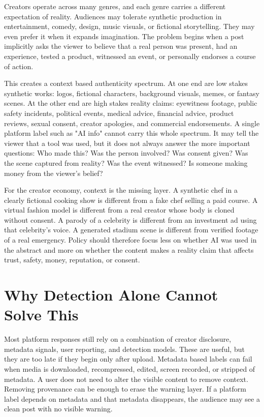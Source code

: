\documentclass[11pt]{article}
\begin{document}
Creators operate across many genres, and each genre carries a different expectation of reality. Audiences may tolerate synthetic production in entertainment, comedy, design, music visuals, or fictional storytelling. They may even prefer it when it expands imagination. The problem begins when a post implicitly asks the viewer to believe that a real person was present, had an experience, tested a product, witnessed an event, or personally endorses a course of action.

This creates a context based authenticity spectrum. At one end are low stakes synthetic works: logos, fictional characters, background visuals, memes, or fantasy scenes. At the other end are high stakes reality claims: eyewitness footage, public safety incidents, political events, medical advice, financial advice, product reviews, sexual consent, creator apologies, and commercial endorsements. A single platform label such as "AI info" cannot carry this whole spectrum. It may tell the viewer that a tool was used, but it does not always answer the more important questions: Who made this? Was the person involved? Was consent given? Was the scene captured from reality? Was the event witnessed? Is someone making money from the viewer's belief?

For the creator economy, context is the missing layer. A synthetic chef in a clearly fictional cooking show is different from a fake chef selling a paid course. A virtual fashion model is different from a real creator whose body is cloned without consent. A parody of a celebrity is different from an investment ad using that celebrity's voice. A generated stadium scene is different from verified footage of a real emergency. Policy should therefore focus less on whether AI was used in the abstract and more on whether the content makes a reality claim that affects trust, safety, money, reputation, or consent.

\section{Why Detection Alone Cannot Solve This}

Most platform responses still rely on a combination of creator disclosure, metadata signals, user reporting, and detection models. These are useful, but they are too late if they begin only after upload. Metadata based labels can fail when media is downloaded, recompressed, edited, screen recorded, or stripped of metadata. A user does not need to alter the visible content to remove context. Removing provenance can be enough to erase the warning layer. If a platform label depends on metadata and that metadata disappears, the audience may see a clean post with no visible warning.
\end{document}

